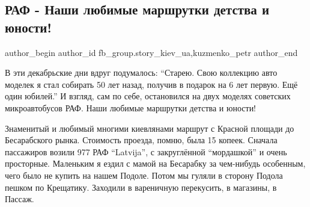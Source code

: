  
 
 
 
 
 
\subsection{РАФ - Наши любимые маршрутки детства и юности!}
\label{sec:13_12_2021.fb.fb_group.story_kiev_ua.2.raf_marshrutka}
 
\ifcmt
 author_begin
   author_id fb_group.story_kiev_ua,kuzmenko_petr
 author_end
\fi

В эти декабрьские дни вдруг подумалось: \enquote{Старею. Свою коллекцию авто моделек я
стал собирать 50 лет назад, получив в подарок на 6 лет первую. Ещё один
юбилей.} И взгляд, сам по себе, остановился на двух моделях советских
микроавтобусов РАФ. Наши любимые маршрутки детства и юности! 

\begin{multicols}{2} %
\setlength{\parindent}{0pt}



\end{multicols} %

Знаменитый и любимый многими киевлянами маршрут с Красной площади до
Бесарабского рынка.  Стоимость проезда, помню, была 15 копеек. Сначала
пассажиров возили 977 РАФ \enquote{Latvija}, с закруглённой \enquote{мордашкой} и очень
просторные. Маленьким я ездил с мамой на Бесарабку за чем-нибудь особенным,
чего было не купить на нашем Подоле. Потом мы гуляли в сторону Подола пешком по
Крещатику. Заходили в вареничную перекусить, в магазины, в Пассаж. 

